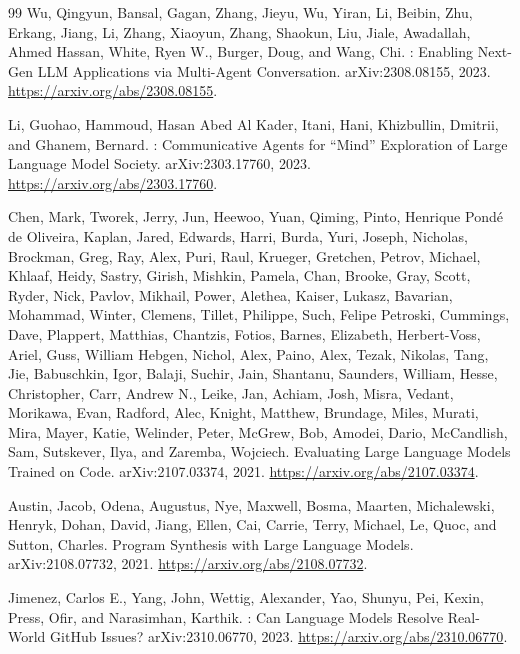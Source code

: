 \begin{thebibliography}{99}
Wu, Qingyun, Bansal, Gagan, Zhang, Jieyu, Wu, Yiran, Li, Beibin, Zhu, Erkang, Jiang, Li, Zhang, Xiaoyun, Zhang, Shaokun, Liu, Jiale, Awadallah, Ahmed Hassan, White, Ryen W., Burger, Doug, and Wang, Chi.
: Enabling Next-Gen LLM Applications via Multi-Agent Conversation.
\newblock arXiv:2308.08155, 2023.
\newblock \url{https://arxiv.org/abs/2308.08155}.

Li, Guohao, Hammoud, Hasan Abed Al Kader, Itani, Hani, Khizbullin, Dmitrii, and Ghanem, Bernard.
: Communicative Agents for ``Mind'' Exploration of Large Language Model Society.
\newblock arXiv:2303.17760, 2023.
\newblock \url{https://arxiv.org/abs/2303.17760}.

Chen, Mark, Tworek, Jerry, Jun, Heewoo, Yuan, Qiming, Pinto, Henrique Pond{\'e} de Oliveira, Kaplan, Jared, Edwards, Harri, Burda, Yuri, Joseph, Nicholas, Brockman, Greg, Ray, Alex, Puri, Raul, Krueger, Gretchen, Petrov, Michael, Khlaaf, Heidy, Sastry, Girish, Mishkin, Pamela, Chan, Brooke, Gray, Scott, Ryder, Nick, Pavlov, Mikhail, Power, Alethea, Kaiser, Lukasz, Bavarian, Mohammad, Winter, Clemens, Tillet, Philippe, Such, Felipe Petroski, Cummings, Dave, Plappert, Matthias, Chantzis, Fotios, Barnes, Elizabeth, Herbert-Voss, Ariel, Guss, William Hebgen, Nichol, Alex, Paino, Alex, Tezak, Nikolas, Tang, Jie, Babuschkin, Igor, Balaji, Suchir, Jain, Shantanu, Saunders, William, Hesse, Christopher, Carr, Andrew N., Leike, Jan, Achiam, Josh, Misra, Vedant, Morikawa, Evan, Radford, Alec, Knight, Matthew, Brundage, Miles, Murati, Mira, Mayer, Katie, Welinder, Peter, McGrew, Bob, Amodei, Dario, McCandlish, Sam, Sutskever, Ilya, and Zaremba, Wojciech.
\newblock Evaluating Large Language Models Trained on Code.
\newblock arXiv:2107.03374, 2021.
\newblock \url{https://arxiv.org/abs/2107.03374}.

Austin, Jacob, Odena, Augustus, Nye, Maxwell, Bosma, Maarten, Michalewski, Henryk, Dohan, David, Jiang, Ellen, Cai, Carrie, Terry, Michael, Le, Quoc, and Sutton, Charles.
\newblock Program Synthesis with Large Language Models.
\newblock arXiv:2108.07732, 2021.
\newblock \url{https://arxiv.org/abs/2108.07732}.

Jimenez, Carlos E., Yang, John, Wettig, Alexander, Yao, Shunyu, Pei, Kexin, Press, Ofir, and Narasimhan, Karthik.
: Can Language Models Resolve Real-World GitHub Issues?
\newblock arXiv:2310.06770, 2023.
\newblock \url{https://arxiv.org/abs/2310.06770}.


\end{thebibliography}
